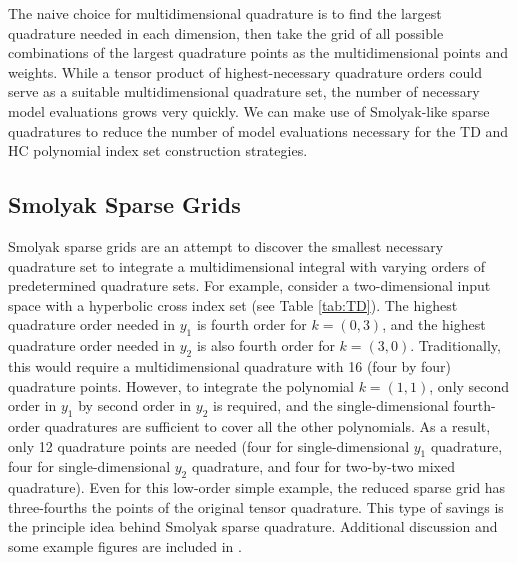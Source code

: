 The naive choice for multidimensional quadrature is to find the largest quadrature needed in each dimension,
then take the grid of all possible combinations of the largest quadrature points as the multidimensional
points and weights.
While a tensor product of highest-necessary quadrature orders could serve as a suitable multidimensional
quadrature set, the number of necessary model evaluations grows very quickly.  We can make use of Smolyak-like sparse 
quadratures to reduce the number of model
evaluations necessary for the TD and HC polynomial index set construction strategies.

\subsection{Smolyak Sparse Grids}
Smolyak sparse grids \cite{smolyak} are an attempt to discover the smallest necessary quadrature set to
integrate a multidimensional integral with varying orders of predetermined quadrature sets.  For example,
consider a two-dimensional input space with a hyperbolic cross index set (see Table \ref{tab:TD}).  The
highest quadrature order needed in $y_1$ is fourth order for $k=(0,3)$, and the highest quadrature order needed
in $y_2$ is also fourth order for $k=(3,0)$.  Traditionally, this would require a multidimensional quadrature
with 16 (four by four) quadrature points.  However, to integrate the polynomial $k=(1,1)$, only second order
in $y_1$ by second order in $y_2$ is required, and the single-dimensional fourth-order quadratures are
sufficient to cover all the other polynomials.  As a result, only 12 quadrature points are needed (four for
single-dimensional $y_1$ quadrature, four for single-dimensional $y_2$ quadrature, and four for two-by-two
mixed quadrature).  Even for this low-order simple example, the reduced sparse grid has three-fourths the
points of the original tensor quadrature.  This type of savings is the principle idea behind Smolyak sparse 
quadrature.  Additional discussion and some example figures are included in \cite{Ayres}.

